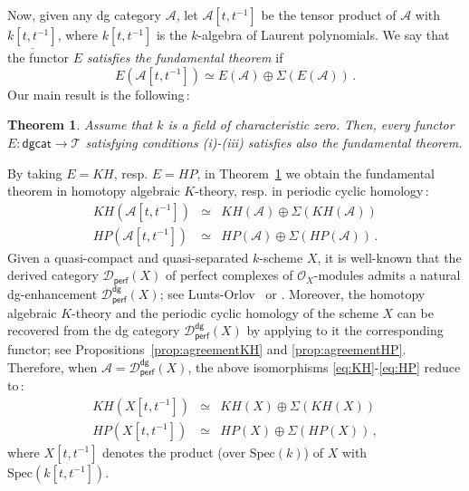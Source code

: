 \documentclass{amsart}
\numberwithin{equation}{subsection}
\newtheorem{theorem}{Theorem}[section]
\theoremstyle{remark}
\theoremstyle{remark}
\theoremstyle{remark}
\theoremstyle{remark}
\begin{document}
Now, given any dg category ${{\mathcal A}}$, let ${{\mathcal A}}[t,t^{-1}]$ be the tensor product of ${{\mathcal A}}$ with $\underline{k[t,t^{-1}]}$, where $k[t,t^{-1}]$ is the $k$-algebra of Laurent polynomials. We say that the functor $E$ {\em satisfies the fundamental theorem} if
\begin{equation*}
E({{\mathcal A}}[t,t^{-1}]) \simeq E({{\mathcal A}}) \oplus \Sigma(E({{\mathcal A}}))\,.
\end{equation*}
Our main result is the following\,:
\begin{theorem}\label{thm:fundamental}
Assume that $k$ is a field of characteristic zero. Then, every functor $E: {\mathsf{dgcat}} \to {{\mathcal T}}$ satisfying conditions {\em (i)-(iii)} satisfies also the fundamental theorem.
\end{theorem}
By taking $E=KH$, resp. $E=HP$, in Theorem~\ref{thm:fundamental} we obtain the fundamental theorem in homotopy algebraic $K$-theory, resp. in periodic cyclic homology\,:
\begin{eqnarray}
KH({{\mathcal A}}[t,t^{-1}]) &\simeq& KH({{\mathcal A}}) \oplus \Sigma(KH({{\mathcal A}}))  \label{eq:KH} \\
HP({{\mathcal A}}[t,t^{-1}]) &\simeq& HP({{\mathcal A}}) \oplus \Sigma(HP({{\mathcal A}}))   \label{eq:HP}\,.
\end{eqnarray}
Given a quasi-compact and quasi-separated $k$-scheme $X$, it is well-known that the derived category ${{\mathcal D}}_{\mathsf{perf}}(X)$ of perfect complexes of ${{\mathcal O}}_X$-modules admits a natural dg-enhancement ${{\mathcal D}}_{\mathsf{perf}}^{\mathsf{dg}}(X)$; see Lunts-Orlov~\cite{LO} or \cite[Example~4.5]{CT1}. Moreover, the homotopy algebraic $K$-theory and the periodic cyclic homology of the scheme $X$ can be recovered from the dg category ${{\mathcal D}}_{\mathsf{perf}}^{\mathsf{dg}}(X)$ by applying to it the corresponding functor; see Propositions~\ref{prop:agreementKH} and \ref{prop:agreementHP}. Therefore, when ${{\mathcal A}}={{\mathcal D}}_{\mathsf{perf}}^{\mathsf{dg}}(X)$, the above isomorphisms \eqref{eq:KH}-\eqref{eq:HP} reduce to\,:
\begin{eqnarray}
KH(X[t,t^{-1}]) &\simeq& KH(X) \oplus \Sigma(KH(X))  \label{eq:KH-schemes} \\
HP(X[t,t^{-1}]) &\simeq& HP(X) \oplus \Sigma(HP(X))   \label{eq:HP-schemes}\,,
\end{eqnarray}
where $X[t,t^{-1}]$ denotes the product (over $\mathrm{Spec}(k)$) of $X$ with $\mathrm{Spec}(k[t,t^{-1}])$.
\end{document}
